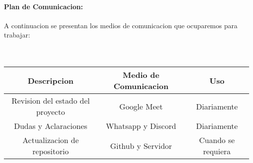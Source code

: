 \documentclass[40pt]{article}
\begin{document}
\maketitle
\textsf{\ \\
\textbf{Plan de Comunicacion:}\\
\\
A continuacion se presentan los medios de comunicacion que ocuparemos para trabajar: \\}
\\
\\
\begin{tabular}{| c | c | c |} \hline
\textbf{Descripcion} & \textbf{Medio de Comunicacion} & \textbf{Uso} \\ \hline
Revision del estado del proyecto & Google Meet & Diariamente \\ \hline
Dudas y Aclaraciones & Whatsapp y Discord & Diariamente \\ \hline
Actualizacion de repositorio & Github y Servidor & Cuando se requiera \\ \hline
\end{tabular}
\end{document}
